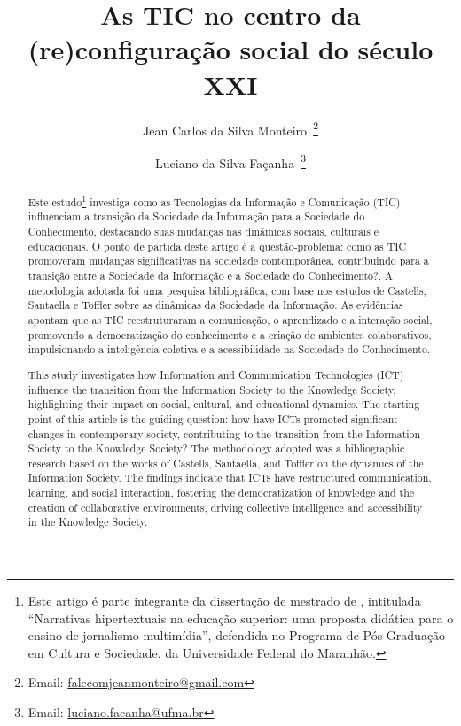 \documentclass[portuguese]{textolivre}
\title{As TIC no centro da (re)configuração social do século XXI}
\author[1]{Jean Carlos da Silva Monteiro~\orcid{0000-0001-8025-3670}\thanks{Email: \href{mailto:falecomjeanmonteiro@gmail.com}{falecomjeanmonteiro@gmail.com}}}
\author[1]{Luciano da Silva Façanha~\orcid{0000-0003-1178-4018}\thanks{Email: \href{mailto:luciano.facanha@ufma.br}{luciano.facanha@ufma.br}}}
\affil[1]{Universidade Federal do Maranhão, Programa de Pós-Graduação em Cultura e Sociedade, São Luís, MA, Brasil.}
\begin{document}
\maketitle

\begin{polyabstract}
\begin{abstract}
Este estudo\footnote{Este artigo é parte integrante da dissertação de mestrado de \textcite{monteiro2019}, intitulada “Narrativas hipertextuais na educação superior: uma proposta didática para o ensino de jornalismo multimídia”, defendida no Programa de Pós-Graduação em Cultura e Sociedade, da Universidade Federal do Maranhão.} investiga como as Tecnologias da Informação e
Comunicação (TIC) influenciam a transição da Sociedade da Informação
para a Sociedade do Conhecimento, destacando suas mudanças nas dinâmicas
sociais, culturais e educacionais. O ponto de partida deste artigo é a
questão-problema: como as TIC promoveram mudanças significativas na
sociedade contemporânea, contribuindo para a transição entre a Sociedade
da Informação e a Sociedade do Conhecimento?. A metodologia adotada
foi uma pesquisa bibliográfica, com base nos estudos de Castells,
Santaella e Toffler sobre as dinâmicas da Sociedade da Informação. As
evidências apontam que as TIC reestruturaram a comunicação, o
aprendizado e a interação social, promovendo a democratização do
conhecimento e a criação de ambientes colaborativos, impulsionando a
inteligência coletiva e a acessibilidade na Sociedade do Conhecimento.

\end{abstract}

\begin{english}
\begin{abstract}
This study investigates how Information and Communication
Technologies (ICT) influence the transition from the Information Society
to the Knowledge Society, highlighting their impact on social, cultural,
and educational dynamics. The starting point of this article is the
guiding question: how have ICTs promoted significant changes in
contemporary society, contributing to the transition from the
Information Society to the Knowledge Society? The methodology adopted
was a bibliographic research based on the works of Castells, Santaella,
and Toffler on the dynamics of the Information Society. The findings
indicate that ICTs have restructured communication, learning, and social
interaction, fostering the democratization of knowledge and the creation
of collaborative environments, driving collective intelligence and
accessibility in the Knowledge Society.

\end{abstract}
\end{english}
\end{polyabstract}
\end{document}
